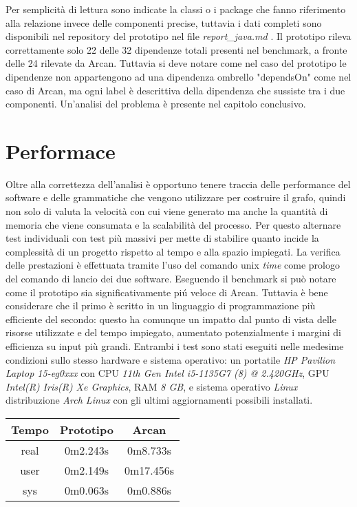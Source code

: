Per semplicit\`a di lettura sono indicate la classi o i package che fanno riferimento alla relazione invece delle componenti precise, tuttavia i dati completi sono disponibili nel repository del prototipo nel file \emph{report\_java.md} \cite{SkullianRepository}. Il prototipo rileva correttamente solo 22 delle 32 dipendenze totali presenti nel benchmark, a fronte delle 24 rilevate da Arcan. Tuttavia si deve notare come nel caso del prototipo le dipendenze non appartengono ad una dipendenza ombrello "dependsOn" come nel caso di Arcan, ma ogni label \`e descrittiva della dipendenza che sussiste tra i due componenti. Un'analisi del problema \`e presente nel capitolo conclusivo.

\section{Performace}

Oltre alla correttezza dell'analisi \`e opportuno tenere traccia delle performance del software e delle grammatiche che vengono utilizzare per costruire il grafo, quindi non solo di valuta la velocit\`a con cui viene generato ma anche la quantit\`a di memoria che viene consumata e la scalabilit\`a del processo.
Per questo alternare test individuali con test pi\`u massivi per mette di stabilire quanto incide la complessit\`a di un progetto rispetto al tempo e alla spazio impiegati. La verifica delle prestazioni \`e effettuata tramite l'uso del comando unix \emph{time} come prologo del comando di lancio dei due software. Eseguendo il benchmark si pu\`o notare come il prototipo sia significativamente pi\'u veloce di Arcan. Tuttavia \`e bene considerare che il primo \`e scritto in un linguaggio di programmazione pi\`u efficiente del secondo: questo ha comunque un impatto dal punto di vista delle risorse utilizzate e del tempo impiegato, aumentato potenzialmente i margini di efficienza su input pi\`u grandi.
Entrambi i test sono stati eseguiti nelle medesime condizioni sullo stesso hardware e sistema operativo: un portatile \emph{HP Pavilion Laptop 15-eg0xxx} con CPU \emph{11th Gen Intel i5-1135G7 (8) @ 2.420GHz}, GPU \emph{Intel(R) Iris(R) Xe Graphics}, RAM \emph{8 GB}, e sistema operativo \emph{Linux} distribuzione \emph{Arch Linux} con gli ultimi aggiornamenti possibili installati.

\begin{center}
    \begin{tabular}{|c | c | c|}
        \hline
        Tempo & Prototipo & Arcan \\
        \hline
        real & 0m2.243s & 0m8.733s \\
        user & 0m2.149s & 0m17.456s \\
        sys & 0m0.063s & 0m0.886s \\
        \hline
    \end{tabular}
\end{center}


